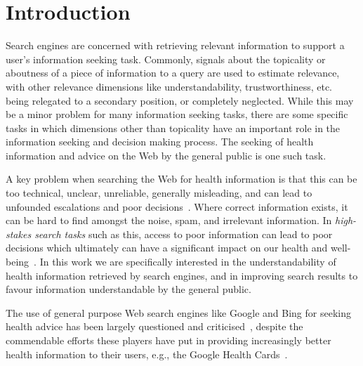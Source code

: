 
\section{Introduction}
\label{chp:understanding_understandability}

Search engines are concerned with retrieving relevant information to support a user's information seeking task. Commonly, signals about the topicality or aboutness of a piece of information to a query are used to estimate relevance, with other relevance dimensions like understandability, trustworthiness, etc.~\cite{zhang2014multidimensional} being relegated to a secondary position, or completely neglected. While this may be a minor problem for many information seeking tasks, there are some specific tasks in which dimensions other than topicality have an important role in the information seeking and decision making process. The seeking of health information and advice on the Web by the general public is one such task. 

A key problem when searching the Web for health information is that this can be too technical, unclear, unreliable, generally misleading, and can lead to unfounded escalations and poor decisions~\cite{white09b}. Where correct information exists, it can be hard to find amongst the noise, spam, and irrelevant information. In \textit{high-stakes search tasks} such as this, access to poor information can lead to poor decisions which ultimately can have a significant impact on our health and well-being~\cite{white09b,white13}. In this work we are specifically interested in the understandability of health information retrieved by search engines, and in improving search results to favour information understandable by the general public. 

The use of general purpose Web search engines like Google and Bing for seeking health advice has been largely questioned and criticised~\cite{graber99readability,fitzsimmons2010readability,wiener2013readability,patel13readability,atcherson14readability,meillier17readability,ellimoottil2012readability}, despite the commendable efforts these players have put in providing increasingly better health information to their users, e.g., the Google Health Cards~\cite{gabrilovich2016cura}. 

